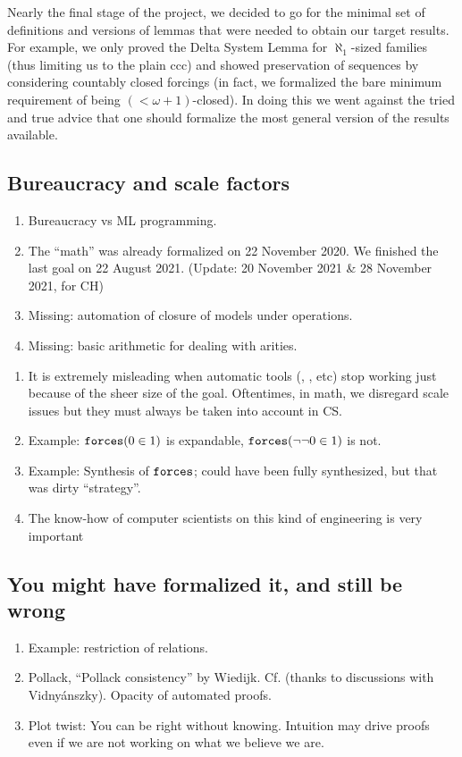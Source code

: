Nearly the final stage of the project, we decided to go for the minimal
set of definitions and versions of lemmas that were needed to obtain
our target results. For example, we only proved the Delta System Lemma
for $\aleph_1$-sized families (thus limiting us to the plain ccc) and
showed preservation of sequences by considering countably closed
forcings (in fact, we formalized the bare minimum requirement of being
$(<\omega+1)$-closed). In doing this we went against the tried and
true advice that one should formalize the most general version of the
results available.

\subsection{Bureaucracy and scale factors}

\begin{enumerate}
\item Bureaucracy vs ML programming.
\item The “math” was already formalized on 22 November 2020.
  We finished the last goal on 22 August 2021.
  (Update: 20 November 2021 \& 28 November 2021, for CH)
\item Missing: automation of closure of models under operations.
\item Missing: basic arithmetic for dealing with arities.
\end{enumerate}

\begin{enumerate}
\item It is extremely misleading when automatic tools (, , etc)
  stop working just because of the sheer size of the goal. Oftentimes,
  in math, we disregard scale issues but they must always be taken
  into account in CS.
\item Example: $\mathop{\mathtt{forces}}(0\in 1)$ is expandable,
  $\mathop{\mathtt{forces}}(\neg\neg  0\in 1)$ is not.
\item Example: Synthesis of $\mathop{\mathtt{forces}}$; could have been fully synthesized,
  but that was dirty “strategy”.
\item The know-how of computer scientists on this kind of engineering is
  very important
\end{enumerate}

\subsection{You might have formalized it, and still be wrong}
\begin{enumerate}
\item Example: restriction of relations.
\item Pollack, “Pollack consistency” by
  Wiedijk. Cf.  (thanks to discussions with
  Vidnyánszky). Opacity of automated proofs. 
\item Plot twist: You can be right without knowing. Intuition may drive proofs
  even if we are not working on what we believe we are.
\end{enumerate}

